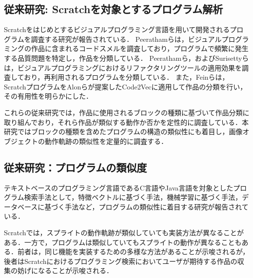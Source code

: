 \documentclass[T,J]{fose} %
\newcommand{\todo}[1]{\colorbox{yellow}{{\bf TODO}:}{\color{red} {\textbf{[#1]}}}}
\begin{document}
\subsection{従来研究: Scratchを対象とするプログラム解析}\label{subsec:analyze-scratch}

Scratchをはじめとするビジュアルプログラミング言語を用いて開発されるプログラムを調査する研究が報告されている\cite{Talbot_2020}．
Peeratham\cite{Understanding}らは，ビジュアルプログラミングの作品に含まれるコードスメルを調査しており，プログラムで頻繁に発生する品質問題を特定し，作品を分類している．
Peeratham\cite{techapalokul2019code}ら，およびSurisettyら\cite{Surisetty_2015}は，ビジュアルプログラミングにおけるリファクタリングツールの適用効果を調査しており，再利用されるプログラムを分類している．
また，Fein\cite{fein2022evaluation}らは，ScratchプログラムをAlonら\cite{alon2019code2vec}が提案したCode2Vecに適用して作品の分類を行い，その有用性を明らかにした．

これらの従来研究では，作品に使用されるブロックの種類に基づいて作品分類に取り組んでおり，それら作品が類似する動作か否かを定性的に調査している．本研究ではブロックの種類を含めたプログラムの構造の類似性にも着目し，画像オブジェクトの動作軌跡の類似性を定量的に調査する．

\subsection{従来研究：プログラムの類似度}\label{subsec:similarity of scratch}
テキストベースのプログラミング言語であるC言語やJava言語を対象としたプログラム検索手法として，特徴ベクトルに基づく手法，機械学習に基づく手法，データベースに基づく手法など，プログラムの類似性に着目する研究が報告されている\cite{Grazia_2023}．

Scratchでは，スプライトの動作軌跡が類似していても実装方法が異なることがある．一方で，プログラムは類似していてもスプライトの動作が異なることもある\cite{Surisetty_2015}．前者は，同じ機能を実装するための多様な方法があることが示唆されるが，後者はScratchにおけるプログラミング検索においてユーザが期待する作品の収集の妨げになることが示唆される．
\end{document}

